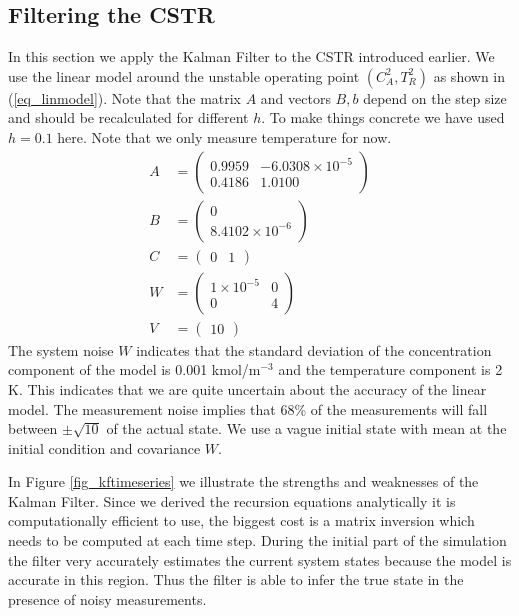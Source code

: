 \documentclass[../masters.tex]{subfiles}
\begin{document}
\subsection{Filtering the CSTR}
In this section we apply the Kalman Filter to the CSTR introduced earlier. We use the linear model around the unstable operating point $(C_A^2, T_R^2)$ as shown in (\ref{eq_linmodel}). Note that the matrix $A$ and vectors $B, b$ depend on the step size and should be recalculated for different $h$. To make things concrete we have used $h=0.1$ here. Note that we only measure temperature for now.
\begin{equation}
\begin{aligned}
A &= \begin{pmatrix}
0.9959 & -6.0308\times 10^{-5} \\
0.4186 & 1.0100
\end{pmatrix} \\
B &= \begin{pmatrix}
0 \\ 8.4102\times 10^{-6}
\end{pmatrix} \\
C &= \begin{pmatrix}
0 & 1
\end{pmatrix} \\
W &= \begin{pmatrix}
1\times 10^{-5} & 0 \\ 0 & 4
\end{pmatrix} \\
V &= \begin{pmatrix}
10
\end{pmatrix}
\end{aligned}
\label{eq_linmodel}
\end{equation}
The system noise $W$ indicates that the standard deviation of the concentration component of the model is 0.001 kmol/m$^{-3}$ and the temperature component is 2 K. This indicates that we are quite uncertain about the accuracy of the linear model. The measurement noise implies that 68\% of the measurements will fall between $\pm\sqrt{10}$ of the actual state. We use a vague initial state with mean at the initial condition and covariance $W$.

In Figure \ref{fig_kftimeseries} we illustrate the strengths and weaknesses of the Kalman Filter. Since we derived the recursion equations analytically it is computationally efficient to use, the biggest cost is a matrix inversion which needs to be computed at each time step. During the initial part of the simulation the filter very accurately estimates the current system states because the model is accurate in this region. Thus the filter is able to infer the true state in the presence of noisy measurements. 
\end{document}
